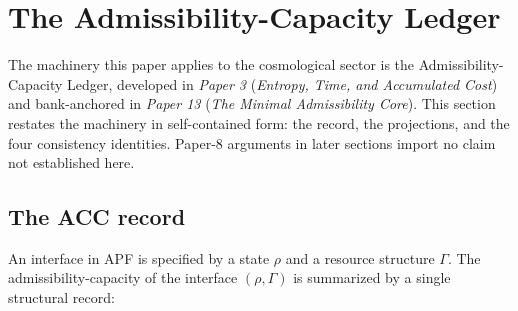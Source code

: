 \documentclass[11pt]{article}
\newcommand{\paperref}[2]{\emph{Paper #1} (\emph{#2})}
\begin{document}
\clearpage

\section{The Admissibility-Capacity Ledger}\label{sec:ledger}

The machinery this paper applies to the cosmological sector is the Admissibility-Capacity Ledger, developed in \paperref{3}{Entropy, Time, and Accumulated Cost} and bank-anchored in \paperref{13}{The Minimal Admissibility Core}. This section restates the machinery in self-contained form: the record, the projections, and the four consistency identities. Paper-8 arguments in later sections import no claim not established here.

\subsection{The ACC record}\label{sec:ledger_record}

An interface in APF is specified by a state $\rho$ and a resource structure $\Gamma$. The admissibility-capacity of the interface $(\rho,\Gamma)$ is summarized by a single structural record:
\end{document}
